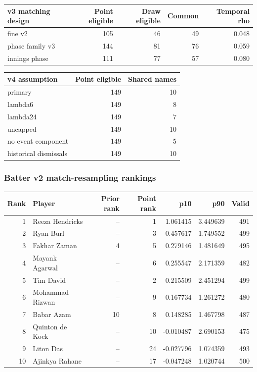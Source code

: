 \begin{center}
\begin{tabularx}{\linewidth}{>{\raggedright\arraybackslash}Xrrrr}
\toprule
v3 matching design & Point eligible & Draw eligible & Common & Temporal rho \\
\midrule
fine v2 & 105 & 46 & 49 & 0.048 \\
phase family v3 & 144 & 81 & 76 & 0.059 \\
innings phase & 111 & 77 & 57 & 0.080 \\
\bottomrule
\end{tabularx}
\end{center}

\begin{center}
\begin{tabularx}{\linewidth}{>{\raggedright\arraybackslash}Xrr}
\toprule
v4 assumption & Point eligible & Shared names \\
\midrule
primary & 149 & 10 \\
lambda6 & 149 & 8 \\
lambda24 & 149 & 7 \\
uncapped & 149 & 10 \\
no event component & 149 & 5 \\
historical dismissals & 149 & 10 \\
\bottomrule
\end{tabularx}
\end{center}

\clearpage

\subsubsection*{Batter v2 match-resampling rankings}

\begin{center}
\begin{tabularx}{\linewidth}{r>{\raggedright\arraybackslash}Xrrrrr}
\toprule
Rank & Player & Prior rank & Point rank & p10 & p90 & Valid \\
\midrule
1 & Reeza Hendricks & -- & 1 & 1.061415 & 3.449639 & 491 \\
2 & Ryan Burl & -- & 3 & 0.457617 & 1.749552 & 499 \\
3 & Fakhar Zaman & 4 & 5 & 0.279146 & 1.481649 & 495 \\
4 & Mayank Agarwal & -- & 6 & 0.255547 & 2.171359 & 482 \\
5 & Tim David & -- & 2 & 0.215509 & 2.451294 & 499 \\
6 & Mohammad Rizwan & -- & 9 & 0.167734 & 1.261272 & 480 \\
7 & Babar Azam & 10 & 8 & 0.148285 & 1.467798 & 487 \\
8 & Quinton de Kock & -- & 10 & -0.010487 & 2.690153 & 475 \\
9 & Liton Das & -- & 24 & -0.027796 & 1.074359 & 493 \\
10 & Ajinkya Rahane & -- & 17 & -0.047248 & 1.020744 & 500 \\
\bottomrule
\end{tabularx}
\end{center}

